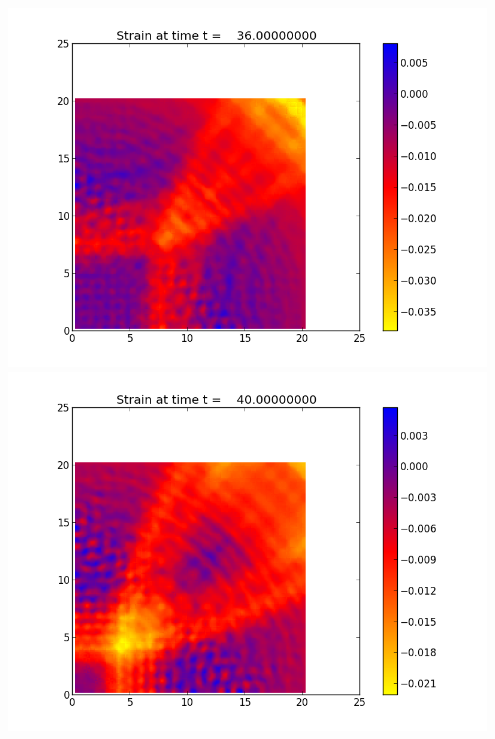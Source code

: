 \documentclass[11pt]{article}
\begin{document}
\vskip 10pt 
\includegraphics[width=0.95\textwidth]{frame0009fig0.png}
\vskip 10pt 
\includegraphics[width=0.95\textwidth]{frame0010fig0.png}
\end{document}
